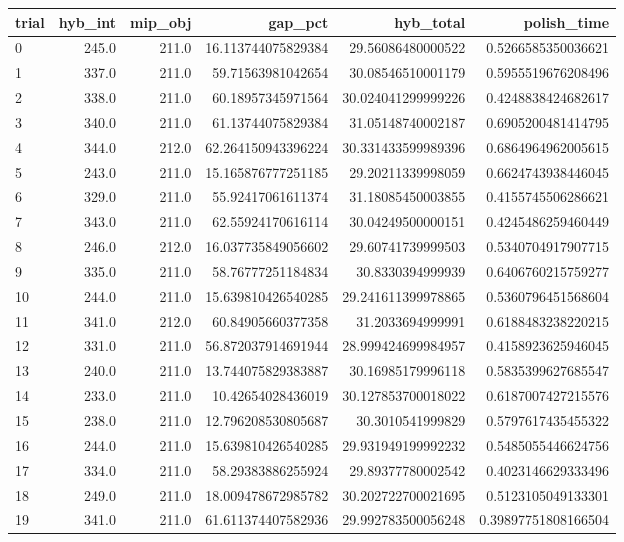 \begin{tabular}{lrrrrr}
\hline
trial & hyb_int & mip_obj & gap_pct & hyb_total & polish_time \\ \hline
0 & 245.0 & 211.0 & 16.113744075829384 & 29.56086480000522 & 0.5266585350036621 \\
1 & 337.0 & 211.0 & 59.71563981042654 & 30.08546510001179 & 0.5955519676208496 \\
2 & 338.0 & 211.0 & 60.18957345971564 & 30.024041299999226 & 0.4248838424682617 \\
3 & 340.0 & 211.0 & 61.13744075829384 & 31.05148740002187 & 0.6905200481414795 \\
4 & 344.0 & 212.0 & 62.264150943396224 & 30.331433599989396 & 0.6864964962005615 \\
5 & 243.0 & 211.0 & 15.165876777251185 & 29.20211339998059 & 0.6624743938446045 \\
6 & 329.0 & 211.0 & 55.92417061611374 & 31.18085450003855 & 0.4155745506286621 \\
7 & 343.0 & 211.0 & 62.55924170616114 & 30.04249500000151 & 0.4245486259460449 \\
8 & 246.0 & 212.0 & 16.037735849056602 & 29.60741739999503 & 0.5340704917907715 \\
9 & 335.0 & 211.0 & 58.76777251184834 & 30.8330394999939 & 0.6406760215759277 \\
10 & 244.0 & 211.0 & 15.639810426540285 & 29.241611399978865 & 0.5360796451568604 \\
11 & 341.0 & 212.0 & 60.84905660377358 & 31.2033694999991 & 0.6188483238220215 \\
12 & 331.0 & 211.0 & 56.872037914691944 & 28.999424699984957 & 0.4158923625946045 \\
13 & 240.0 & 211.0 & 13.744075829383887 & 30.16985179996118 & 0.5835399627685547 \\
14 & 233.0 & 211.0 & 10.42654028436019 & 30.127853700018022 & 0.6187007427215576 \\
15 & 238.0 & 211.0 & 12.796208530805687 & 30.3010541999829 & 0.5797617435455322 \\
16 & 244.0 & 211.0 & 15.639810426540285 & 29.931949199992232 & 0.5485055446624756 \\
17 & 334.0 & 211.0 & 58.29383886255924 & 29.89377780002542 & 0.4023146629333496 \\
18 & 249.0 & 211.0 & 18.009478672985782 & 30.202722700021695 & 0.5123105049133301 \\
19 & 341.0 & 211.0 & 61.611374407582936 & 29.992783500056248 & 0.39897751808166504 \\
\hline
\end{tabular}
